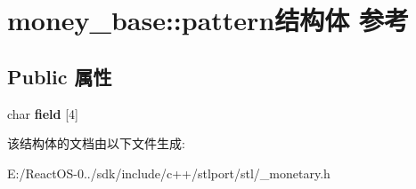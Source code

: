 \hypertarget{structmoney__base_1_1pattern}{}\section{money\+\_\+base\+:\+:pattern结构体 参考}
\label{structmoney__base_1_1pattern}
\subsection*{Public 属性}
\begin{DoxyCompactItemize}
\item 
\mbox{\label{structmoney__base_1_1pattern_a538943e3cd1e40b2a878f3c321a901a9}} 
char {\bfseries field} \mbox{[}4\mbox{]}
\end{DoxyCompactItemize}


该结构体的文档由以下文件生成\+:\begin{DoxyCompactItemize}
\item 
E\+:/\+React\+O\+S-\/0../sdk/include/c++/stlport/stl/\+\_\+monetary.\+h\end{DoxyCompactItemize}
